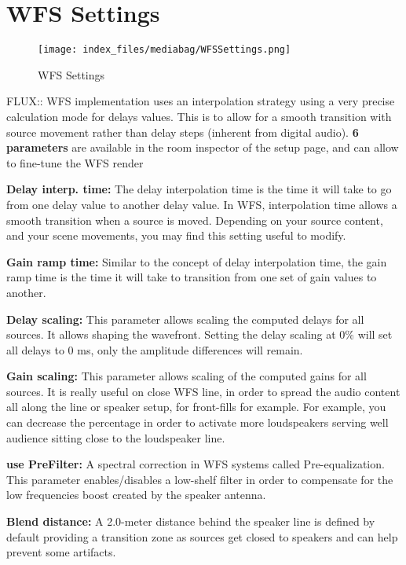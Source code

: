 \documentclass[
  letterpaper,
  DIV=11,
  numbers=noendperiod]{scrreport}
\begin{document}
\hypertarget{wfs-settings}{%
\section{WFS Settings}\label{wfs-settings}}

\begin{figure}

{\centering \texttt{[image: index\_files/mediabag/WFSSettings.png]}

}

\caption{WFS Settings}

\end{figure}

FLUX:: WFS implementation uses an interpolation strategy using a very
precise calculation mode for delays values. This is to allow for a
smooth transition with source movement rather than delay steps (inherent
from digital audio). \textbf{6 parameters} are available in the room
inspector of the setup page, and can allow to fine-tune the WFS render

\textbf{Delay interp. time:} The delay interpolation time is the time it
will take to go from one delay value to another delay value. In WFS,
interpolation time allows a smooth transition when a source is moved.
Depending on your source content, and your scene movements, you may find
this setting useful to modify.

\textbf{Gain ramp time:} Similar to the concept of delay interpolation
time, the gain ramp time is the time it will take to transition from one
set of gain values to another.

\textbf{Delay scaling:} This parameter allows scaling the computed
delays for all sources. It allows shaping the wavefront. Setting the
delay scaling at 0\% will set all delays to 0 ms, only the amplitude
differences will remain.

\textbf{Gain scaling:} This parameter allows scaling of the computed
gains for all sources. It is really useful on close WFS line, in order
to spread the audio content all along the line or speaker setup, for
front-fills for example. For example, you can decrease the percentage in
order to activate more loudspeakers serving well audience sitting close
to the loudspeaker line.

\textbf{use PreFilter:} A spectral correction in WFS systems called
Pre-equalization. This parameter enables/disables a low-shelf filter in
order to compensate for the low frequencies boost created by the speaker
antenna.

\textbf{Blend distance:} A 2.0-meter distance behind the speaker line is
defined by default providing a transition zone as sources get closed to
speakers and can help prevent some artifacts.
\end{document}
